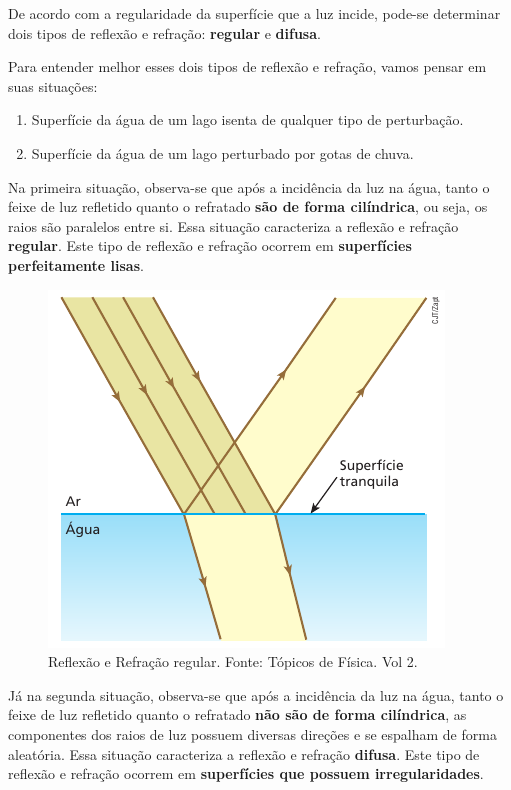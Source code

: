 \documentclass[11pt,twocolumn,oneside]{article}
\begin{document}
De acordo com a regularidade da superfície que a luz incide, pode-se determinar dois tipos de reflexão e refração: \textbf{regular} e \textbf{difusa}.


Para entender melhor esses dois tipos de reflexão e refração, vamos pensar em suas situações:


\begin{enumerate}

\item{Superfície da água de um lago isenta de qualquer tipo de perturbação.}

\item{Superfície da água de um lago perturbado por gotas de chuva.}

\end{enumerate}


Na primeira situação, observa-se que após a incidência da luz na água, tanto o feixe de luz refletido quanto o refratado \textbf{são de forma cilíndrica}, ou seja, os raios são paralelos entre si. Essa situação caracteriza a reflexão e refração \textbf{regular}. Este tipo de reflexão e refração ocorrem em \textbf{superfícies perfeitamente lisas}.


\begin{figure}[h]{}
\centering\includegraphics[width=2.5truein]{img8.png}
\caption{Reflexão e Refração regular. Fonte: Tópicos de Física. Vol 2.}
\centering
\end{figure}

Já na segunda situação, observa-se que após a incidência da luz na água, tanto o feixe de luz refletido quanto o refratado \textbf{não são de forma cilíndrica}, as componentes dos raios de luz possuem diversas direções e se espalham de forma aleatória. Essa situação caracteriza a reflexão e refração \textbf{difusa}. Este tipo de reflexão e refração ocorrem em \textbf{superfícies que possuem irregularidades}.
\end{document}
